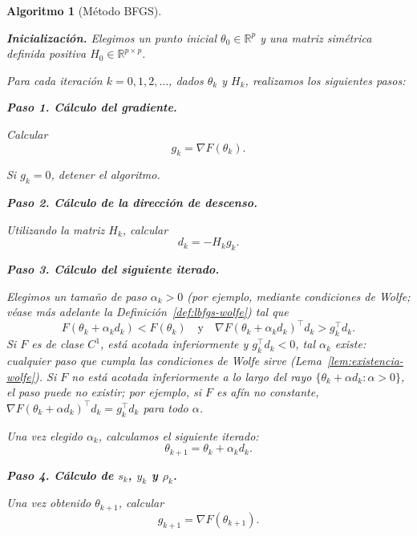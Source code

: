 \documentclass[a4paper,openany,oneside,10pt]{report}
\theoremstyle{pnlTeorema}
\theoremstyle{pnlDefinicion}
\newtheorem{algoritmo}{Algoritmo}[section]
\theoremstyle{pnlObservacion}
\begin{document}
\begin{algoritmo}[Método BFGS]
\label{alg:bfgs}

\textbf{Inicialización.}
Elegimos un punto inicial \(\theta_0\in\mathbb R^p\) y una matriz simétrica definida positiva \(H_0\in\mathbb R^{p\times p}\).

Para cada iteración \(k=0,1,2,\ldots\), dados \(\theta_k\) y \(H_k\), realizamos los siguientes pasos:

\medskip

\noindent\textbf{Paso 1. Cálculo del gradiente.}

Calcular
\[
    g_k=\nabla F(\theta_k).
\]

Si $g_k=0$, detener el algoritmo.

\medskip

\noindent\textbf{Paso 2. Cálculo de la dirección de descenso.}

Utilizando la matriz $H_k$, calcular
\[
    d_k=-H_k g_k.
\]

\medskip

\noindent\textbf{Paso 3. Cálculo del siguiente iterado.}

Elegimos un tamaño de paso \(\alpha_k>0\) (por ejemplo, mediante condiciones de Wolfe; véase más adelante la Definición~\ref{def:lbfgs-wolfe}) tal que
\[
F(\theta_k+\alpha_kd_k)<F(\theta_k) \quad \text{y} \quad \nabla F(\theta_k+\alpha_kd_k)^\top d_k
>g_k^\top d_k.
\]
Si $F$ es de clase $C^1$, está acotada inferiormente y $g_k^\top d_k<0$, tal $\alpha_k$ existe: cualquier paso que cumpla las condiciones de Wolfe sirve (Lema~\ref{lem:existencia-wolfe}). Si $F$ no está acotada inferiormente a lo largo del rayo $\{\theta_k+\alpha d_k:\alpha>0\}$, el paso puede no existir; por ejemplo, si $F$ es afín no constante, $\nabla F(\theta_k+\alpha d_k)^\top d_k=g_k^\top d_k$ para todo $\alpha$.

Una vez elegido \(\alpha_k\), calculamos el siguiente iterado:
\[
\theta_{k+1}=\theta_k+\alpha_kd_k.
\]

\medskip

\noindent\textbf{Paso 4. Cálculo de $s_k$, $y_k$ y $\rho_k$.}

Una vez obtenido $\theta_{k+1}$, calcular
\[
    g_{k+1}=\nabla F(\theta_{k+1}).
\]


\end{algoritmo}
\end{document}
